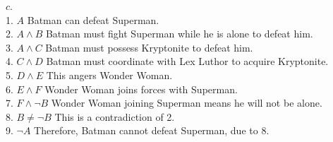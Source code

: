 \documentclass[11pt, oneside]{article}   	%
\begin{document}
\begin{flushleft}
$c$. \\
1. $A$ Batman can defeat Superman. \\
2. $A \wedge B$ Batman must fight Superman while he is alone to defeat him. \\
3. $A \wedge C$ Batman must possess Kryptonite to defeat him. \\
4. $C \wedge D$ Batman must coordinate with Lex Luthor to acquire Kryptonite. \\
5. $D \wedge E$ This angers Wonder Woman. \\
6. $E \wedge F$ Wonder Woman joins forces with Superman. \\
7. $F \wedge \neg B$ Wonder Woman joining Superman means he will not be alone. \\
8. $B \neq \neg B$ This is a contradiction of 2. \\
9. $\neg A$ Therefore, Batman cannot defeat Superman, due to 8.\\\medskip


\end{flushleft}
\end{document}
